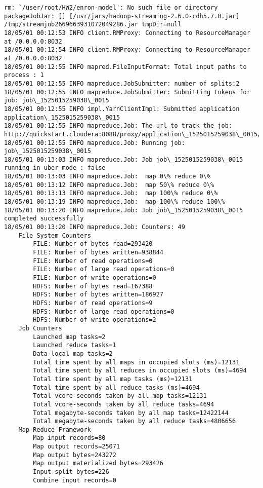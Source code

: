 \documentclass[11pt]{article}
\begin{document}
    \begin{Verbatim}[commandchars=\\\{\}]
rm: `/user/root/HW2/enron-model': No such file or directory
packageJobJar: [] [/usr/jars/hadoop-streaming-2.6.0-cdh5.7.0.jar] /tmp/streamjob2669663931072049286.jar tmpDir=null
18/05/01 00:12:53 INFO client.RMProxy: Connecting to ResourceManager at /0.0.0.0:8032
18/05/01 00:12:54 INFO client.RMProxy: Connecting to ResourceManager at /0.0.0.0:8032
18/05/01 00:12:55 INFO mapred.FileInputFormat: Total input paths to process : 1
18/05/01 00:12:55 INFO mapreduce.JobSubmitter: number of splits:2
18/05/01 00:12:55 INFO mapreduce.JobSubmitter: Submitting tokens for job: job\_1525015259038\_0015
18/05/01 00:12:55 INFO impl.YarnClientImpl: Submitted application application\_1525015259038\_0015
18/05/01 00:12:55 INFO mapreduce.Job: The url to track the job: http://quickstart.cloudera:8088/proxy/application\_1525015259038\_0015/
18/05/01 00:12:55 INFO mapreduce.Job: Running job: job\_1525015259038\_0015
18/05/01 00:13:03 INFO mapreduce.Job: Job job\_1525015259038\_0015 running in uber mode : false
18/05/01 00:13:03 INFO mapreduce.Job:  map 0\% reduce 0\%
18/05/01 00:13:12 INFO mapreduce.Job:  map 50\% reduce 0\%
18/05/01 00:13:13 INFO mapreduce.Job:  map 100\% reduce 0\%
18/05/01 00:13:19 INFO mapreduce.Job:  map 100\% reduce 100\%
18/05/01 00:13:20 INFO mapreduce.Job: Job job\_1525015259038\_0015 completed successfully
18/05/01 00:13:20 INFO mapreduce.Job: Counters: 49
	File System Counters
		FILE: Number of bytes read=293420
		FILE: Number of bytes written=938844
		FILE: Number of read operations=0
		FILE: Number of large read operations=0
		FILE: Number of write operations=0
		HDFS: Number of bytes read=167388
		HDFS: Number of bytes written=186927
		HDFS: Number of read operations=9
		HDFS: Number of large read operations=0
		HDFS: Number of write operations=2
	Job Counters 
		Launched map tasks=2
		Launched reduce tasks=1
		Data-local map tasks=2
		Total time spent by all maps in occupied slots (ms)=12131
		Total time spent by all reduces in occupied slots (ms)=4694
		Total time spent by all map tasks (ms)=12131
		Total time spent by all reduce tasks (ms)=4694
		Total vcore-seconds taken by all map tasks=12131
		Total vcore-seconds taken by all reduce tasks=4694
		Total megabyte-seconds taken by all map tasks=12422144
		Total megabyte-seconds taken by all reduce tasks=4806656
	Map-Reduce Framework
		Map input records=80
		Map output records=25071
		Map output bytes=243272
		Map output materialized bytes=293426
		Input split bytes=226
		Combine input records=0

\end{Verbatim}
\end{document}
